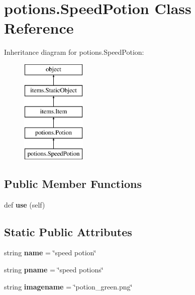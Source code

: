 \hypertarget{classpotions_1_1_speed_potion}{}\section{potions.\+Speed\+Potion Class Reference}
\label{classpotions_1_1_speed_potion}
Inheritance diagram for potions.\+Speed\+Potion\+:\begin{figure}[H]
\begin{center}
\leavevmode
\includegraphics[height=5.000000cm]{classpotions_1_1_speed_potion}
\end{center}
\end{figure}
\subsection*{Public Member Functions}
\begin{DoxyCompactItemize}
\item 
\hypertarget{classpotions_1_1_speed_potion_a905d6ca9456f8b3b102d1c21d6066719}{}def {\bfseries use} (self)\label{classpotions_1_1_speed_potion_a905d6ca9456f8b3b102d1c21d6066719}

\end{DoxyCompactItemize}
\subsection*{Static Public Attributes}
\begin{DoxyCompactItemize}
\item 
\hypertarget{classpotions_1_1_speed_potion_a4a7ff1a8b288e86f1d858d438794a7d8}{}string {\bfseries name} = \char`\"{}speed potion\char`\"{}\label{classpotions_1_1_speed_potion_a4a7ff1a8b288e86f1d858d438794a7d8}

\item 
\hypertarget{classpotions_1_1_speed_potion_ac176ff2d8efb4a30fd716ca792ee1c2d}{}string {\bfseries pname} = \char`\"{}speed potions\char`\"{}\label{classpotions_1_1_speed_potion_ac176ff2d8efb4a30fd716ca792ee1c2d}

\item 
\hypertarget{classpotions_1_1_speed_potion_a14c6c4fa9642878bda9818083390ec96}{}string {\bfseries imagename} = \char`\"{}potion\+\_\+green.\+png\char`\"{}\label{classpotions_1_1_speed_potion_a14c6c4fa9642878bda9818083390ec96}

\end{DoxyCompactItemize}
